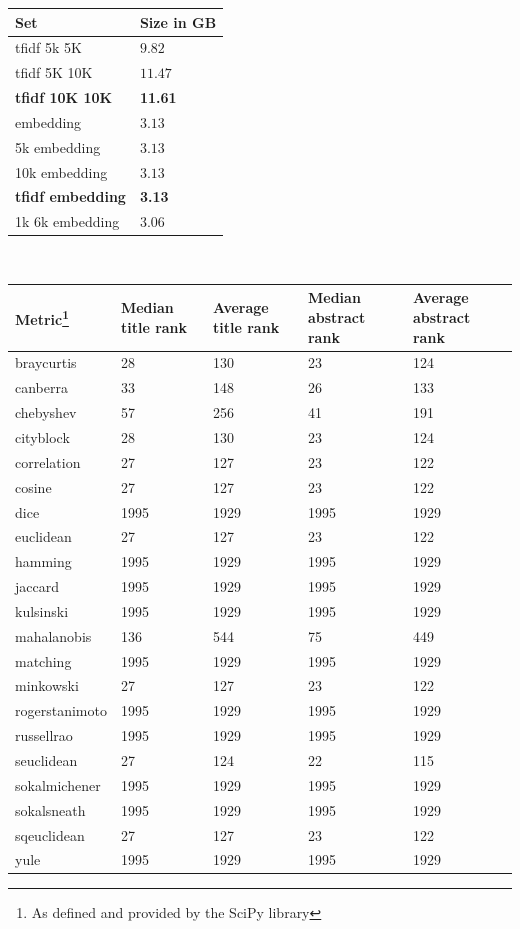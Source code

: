\documentclass[../../Thesis.tex]{subfiles}
\begin{document}
\begin{tabular}{|l|l|}
\hline
Set & Size in GB\\
\hline
tfidf 5k 5K & $9.82$ \\
\hline
tfidf 5K 10K & $11.47$ \\
\hline
\textbf{tfidf 10K 10K} &\textbf{11.61}\\
\hline
embedding & $3.13$ \\
\hline
5k embedding & $3.13$ \\
\hline
10k embedding & $3.13$ \\
\hline
\textbf{tfidf embedding} & \textbf{3.13} \\
\hline
1k 6k embedding & $3.06$ \\
\hline
\end{tabular}
\\
\begin{minipage}{6.5in}
\begin{tabular}{|l|l|l|l|l|}
\hline
Metric\footnote{As defined and provided by the SciPy library} & Median title rank & Average title rank & Median abstract rank & Average abstract rank  \\
\hline
\hline
braycurtis & 28 & 130 & 23 & 124  \\
\hline
canberra & 33 & 148 & 26 & 133  \\
\hline
chebyshev & 57 & 256 & 41 & 191  \\
\hline
cityblock & 28 & 130 & 23 & 124  \\
\hline
correlation & 27 & 127 & 23 & 122  \\
\hline
cosine & 27 & 127 & 23 & 122  \\
\hline
dice & 1995 & 1929 & 1995 & 1929  \\
\hline
euclidean & 27 & 127 & 23 & 122  \\
\hline
hamming & 1995 & 1929 & 1995 & 1929  \\
\hline
jaccard & 1995 & 1929 & 1995 & 1929  \\
\hline
kulsinski & 1995 & 1929 & 1995 & 1929  \\
\hline
mahalanobis & 136 & 544 & 75 & 449  \\
\hline
matching & 1995 & 1929 & 1995 & 1929  \\
\hline
minkowski & 27 & 127 & 23 & 122  \\
\hline
rogerstanimoto & 1995 & 1929 & 1995 & 1929  \\
\hline
russellrao & 1995 & 1929 & 1995 & 1929  \\
\hline
seuclidean & 27 & 124 & 22 & 115  \\
\hline
sokalmichener & 1995 & 1929 & 1995 & 1929  \\
\hline
sokalsneath & 1995 & 1929 & 1995 & 1929  \\
\hline
sqeuclidean & 27 & 127 & 23 & 122  \\
\hline
yule & 1995 & 1929 & 1995 & 1929  \\
\hline
\end{tabular}
\end{minipage}
\end{document}
